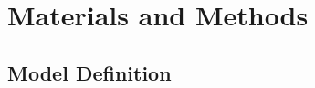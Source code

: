 \documentclass[10pt]{article}
\begin{document}





\section*{Materials and Methods}



\subsection*{Model Definition}

\end{document}
